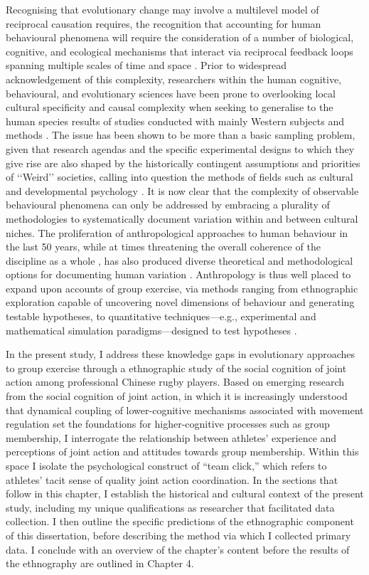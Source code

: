 Recognising that evolutionary change may involve a multilevel model of reciprocal causation requires, the recognition that accounting for human behavioural phenomena will require the consideration of a number of biological, cognitive, and ecological mechanisms that interact via reciprocal feedback loops spanning multiple scales of time and space \citep{Fuentes2015}.  Prior to widespread acknowledgement of this complexity, researchers within the human cognitive, behavioural, and evolutionary sciences have been prone to overlooking local cultural specificity and causal complexity when seeking to generalise to the human species results of studies conducted with mainly Western subjects and methods \citep{Henrich2010d}.  The issue has been shown to be more than a basic sampling problem, given that research agendas and the specific experimental designs to which they give rise are also shaped by the historically contingent assumptions and priorities of ‘‘Weird’’ societies, calling into question the methods of fields such as cultural and developmental psychology \citep{Whitehouse2012}.  It is now clear that the complexity of observable behavioural phenomena can only be addressed by embracing a plurality of methodologies to systematically document variation within and between cultural niches.  The proliferation of anthropological approaches to human behaviour in the last 50 years, while at times threatening the overall coherence of the discipline as a whole \citep{Beller2012}, has also produced diverse theoretical and methodological options for documenting human variation \citep{Fuentes2016a}.  Anthropology is thus well placed to expand upon accounts of group exercise, via methods ranging from ethnographic exploration capable of uncovering novel dimensions of behaviour and generating testable hypotheses, to quantitative techniques---e.g., experimental and mathematical simulation paradigms---designed to test hypotheses \citep{Epstein2006,Fuentes2016}.

In the present study, I address these knowledge gaps in evolutionary approaches to group exercise through a ethnographic study of the social cognition of joint action among professional Chinese rugby players.  Based on emerging research from the social cognition of joint action, in which it is increasingly understood that dynamical coupling of lower-cognitive mechanisms associated with movement regulation set the foundations for higher-cognitive processes such as group membership, I interrogate the relationship between athletes' experience and perceptions of joint action and attitudes towards group membership.  Within this space I isolate the psychological construct of ``team click,'' which refers to athletes' tacit sense of quality joint action coordination.  In the sections that follow in this chapter, I establish the historical and cultural context of the present study, including my unique qualifications as researcher that facilitated data collection.  I then outline the specific predictions of the ethnographic component of this dissertation, before describing the method via which I collected primary data. I conclude with an overview of the chapter's content before the results of the ethnography are outlined in Chapter 4.


